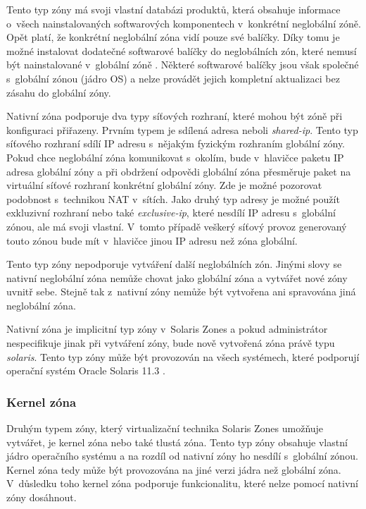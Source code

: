 Tento typ zóny má svoji vlastní databázi produktů, která obsahuje informace o~všech nainstalovaných softwarových
komponentech v~konkrétní neglobální zóně. Opět platí, že konkrétní neglobální zóna vidí pouze své balíčky. Díky tomu je možné
instalovat dodatečné softwarové balíčky do neglobálních zón, které nemusí být nainstalované v~globální zóně
\cite{oracle:solaris:zones:brands}. Některé softwarové balíčky jsou však společné s~globální zónou (jádro OS) a nelze
provádět jejich kompletní aktualizaci bez zásahu do globální zóny. 

Nativní zóna podporuje dva typy síťových rozhraní, které mohou být zóně při konfiguraci přiřazeny. Prvním typem je sdílená 
adresa neboli \textit{shared-ip}. Tento typ síťového rozhraní sdílí IP adresu s~nějakým fyzickým rozhraním globální zóny. 
Pokud chce neglobální zóna komunikovat s~okolím, bude v~hlavičce paketu IP adresa globální zóny a při obdržení odpovědi
globální zóna přesměruje paket na virtuální síťové rozhraní konkrétní globální zóny. Zde je možné pozorovat podobnost
s~technikou NAT v~sítích. Jako druhý typ adresy je možné použít exkluzivní rozhraní nebo také \textit{exclusive-ip}, které
nesdílí IP adresu s~globální zónou, ale má svoji vlastní. V~tomto případě veškerý síťový provoz generovaný touto zónou bude
mít v~hlavičce jinou IP adresu než zóna globální.

Tento typ zóny nepodporuje vytváření další neglobálních zón. Jinými slovy se nativní neglobální zóna nemůže chovat jako
globální zóna a vytvářet nové zóny uvnitř sebe. Stejně tak z~nativní zóny nemůže být vytvořena ani spravována jiná neglobální
zóna.

Nativní zóna je implicitní typ zóny v~Solaris Zones a pokud administrátor nespecifikuje jinak při vytváření zóny, bude nově
vytvořená zóna právě typu \textit{solaris}. Tento typ zóny může být provozován na všech systémech, které podporují operační
systém Oracle Solaris 11.3 \cite{oracle:solaris:zones:brands}.
\subsubsection{Kernel zóna}
\label{chapter:zones:types:kernel}
Druhým typem zóny, který virtualizační technika Solaris Zones umožňuje vytvářet, je kernel zóna nebo také tlustá zóna. Tento
typ zóny obsahuje vlastní jádro operačního systému a na rozdíl od nativní zóny ho nesdílí s~globální zónou. Kernel zóna
tedy může být provozována na jiné verzi jádra než globální zóna. V~důsledku toho kernel zóna podporuje funkcionalitu,
které nelze pomocí nativní zóny dosáhnout.


